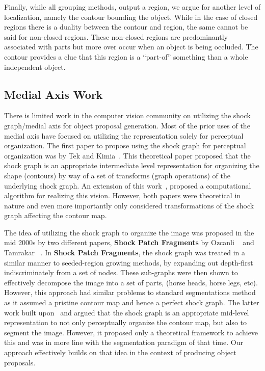 Finally, while all grouping methods, output a region, we argue for another level of localization, namely the contour bounding the object. While in the case of closed regions there is a duality between the contour and region, the same cannot be said for non-closed regions. These non-closed regions are predominantly associated with parts but more over occur when an object is being occluded. The contour provides a clue that this region is a ``part-of'' something than a whole independent object. 



\subsection{Medial Axis Work}


There is limited work in the computer vision community on utilizing the shock graph/medial axis for object proposal generation. Most of the prior uses of the medial axis have focused on utilizing the representation solely for perceptual organization. The first paper to propose using the shock graph for perceptual organization was by Tek and Kimia~\cite{Tek:Kimia:CVPR99}. This theoretical paper proposed that the shock graph is an appropriate intermediate level representation for organizing the shape (contours) by way of a set of transforms (graph operations) of the underlying shock graph. An extension of this work~\cite{Johannes:POCV2001}, proposed a computational algorithm for realizing this vision. However, both papers were theoretical in nature and even more importantly only considered transformations of the shock graph affecting the contour map. 

The idea of utilizing the shock graph to organize the image was proposed in the mid 2000s by two different papers, {\bf Shock Patch Fragments} by Ozcanli \etal~\cite{Ozcanli:Kimia:BMVC07} and Tamrakar \etal~\cite{Tamrakar:Kimia:POCV04}. In {\bf Shock Patch Fragments}, the shock graph was treated in a similar manner to seeded-region growing methods, by expanding out depth-first indiscriminately from a set of nodes. These sub-graphs were then shown to effectively decompose the image into a set of parts, (horse heads, horse legs, etc). However, this approach had similar problems to standard segmentations method as it assumed a pristine contour map and hence a perfect shock graph. The latter work built upon~\cite{Tek:Kimia:CVPR99} and argued that the shock graph is an appropriate mid-level representation to not only perceptually organize the contour map, but also to segment the image. However, it proposed only a theoretical framework to achieve this and was in more line with the segmentation paradigm of that time. Our approach effectively builds on that idea in the context of producing object proposals. 

